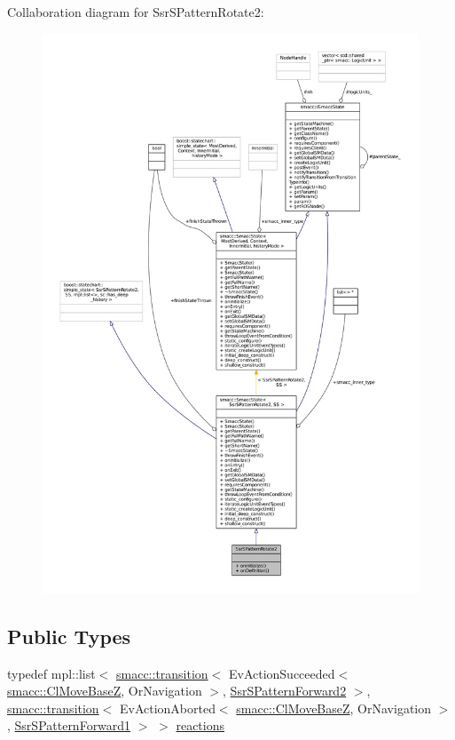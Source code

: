 Collaboration diagram for Ssr\+S\+Pattern\+Rotate2\+:
\nopagebreak
\begin{figure}[H]
\begin{center}
\leavevmode
\includegraphics[width=350pt]{structSsrSPatternRotate2__coll__graph}
\end{center}
\end{figure}
\subsection*{Public Types}
\begin{DoxyCompactItemize}
\item 
typedef mpl\+::list$<$ \hyperlink{classsmacc_1_1transition}{smacc\+::transition}$<$ Ev\+Action\+Succeeded$<$ \hyperlink{classsmacc_1_1ClMoveBaseZ}{smacc\+::\+Cl\+Move\+BaseZ}, Or\+Navigation $>$, \hyperlink{structSsrSPatternForward2}{Ssr\+S\+Pattern\+Forward2} $>$, \hyperlink{classsmacc_1_1transition}{smacc\+::transition}$<$ Ev\+Action\+Aborted$<$ \hyperlink{classsmacc_1_1ClMoveBaseZ}{smacc\+::\+Cl\+Move\+BaseZ}, Or\+Navigation $>$, \hyperlink{structSsrSPatternForward1}{Ssr\+S\+Pattern\+Forward1} $>$ $>$ \hyperlink{structSsrSPatternRotate2_aec40f8fec6467ee60f0aecd09936d68f}{reactions}
\end{DoxyCompactItemize}
